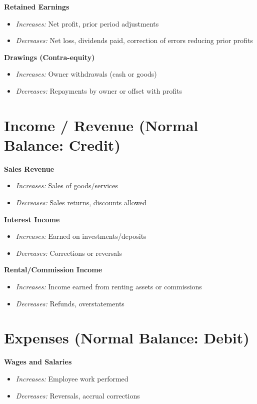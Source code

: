 \textbf{Retained Earnings}
\begin{itemize}
    \item \textit{Increases:} Net profit, prior period adjustments
    \item \textit{Decreases:} Net loss, dividends paid, correction of errors reducing prior profits
\end{itemize}

\textbf{Drawings (Contra-equity)}
\begin{itemize}
    \item \textit{Increases:} Owner withdrawals (cash or goods)
    \item \textit{Decreases:} Repayments by owner or offset with profits
\end{itemize}

\section*{Income / Revenue (Normal Balance: Credit)}

\textbf{Sales Revenue}
\begin{itemize}
    \item \textit{Increases:} Sales of goods/services
    \item \textit{Decreases:} Sales returns, discounts allowed
\end{itemize}

\textbf{Interest Income}
\begin{itemize}
    \item \textit{Increases:} Earned on investments/deposits
    \item \textit{Decreases:} Corrections or reversals
\end{itemize}

\textbf{Rental/Commission Income}
\begin{itemize}
    \item \textit{Increases:} Income earned from renting assets or commissions
    \item \textit{Decreases:} Refunds, overstatements
\end{itemize}

\section*{Expenses (Normal Balance: Debit)}

\textbf{Wages and Salaries}
\begin{itemize}
    \item \textit{Increases:} Employee work performed
    \item \textit{Decreases:} Reversals, accrual corrections
\end{itemize}

